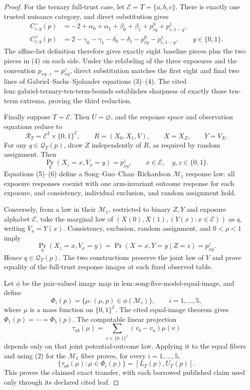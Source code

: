 \documentclass{article}
\begin{document}
\begin{proof}
For the ternary full-trust case, let
\(\mathcal E=T=\{a,b,c\}\).  There is exactly one trusted nuisance category,
and direct substitution gives
\[
\begin{aligned}
 C^-_{c,y}(p)
 &=-2+\alpha_0+\alpha_1+\beta_0+\beta_1
      +p^0_{cy}+p^1_{c,1-y},\\
 C^+_{c,y}(p)
 &=2-\gamma_0-\gamma_1-\delta_0-\delta_1
      -p^0_{cy}-p^1_{c,1-y},
 \qquad y\in\{0,1\}.
\end{aligned} \tag{4}
\]
The affine-list definition therefore gives exactly eight baseline pieces
plus the two pieces in (4) on each side.  Under the relabeling of the three
exposures and the convention \(p_{xy\cdot z}=p^z_{xy}\), direct substitution
matches the first eight and final two lines of Gabriel--Sachs--Sjolander
equations (3)--(4).  The cited
\(\mathrm{lem{:}gabriel\mbox{-}ternary\mbox{-}ten\mbox{-}term\mbox{-}bounds}\)
establishes sharpness of exactly those ten-term extrema, proving the third
reduction.

Finally suppose \(T=\mathcal E\).  Then \(U=\varnothing\), and the response
space and observation equations reduce to
\[
 \mathcal R_T=\mathcal E^2\times\{0,1\}^{\mathcal E},
 \qquad R=(X_0,X_1,V),
 \qquad X=X_Z,
 \qquad Y=V_X. \tag{5}
\]
For any \(q\in\mathcal Q_T(p)\), draw \(Z\) independently of \(R\), as
required by random assignment.  Then
\[
 \Pr_q(X_z=x,V_x=y)=p^z_{xy},
 \qquad x\in\mathcal E,\quad y,z\in\{0,1\}. \tag{6}
\]
Equations (5)--(6) define a Song--Guo--Chan--Richardson
\(\mathcal M_1\) response law: all exposure responses coexist with one
arm-invariant outcome response for each exposure, and consistency,
individual exclusion, and random assignment hold.

Conversely, from a law in their \(\mathcal M_1\), restricted to binary
\(Z,Y\) and exposure alphabet \(\mathcal E\), take the marginal law of
\((X(0),X(1),(Y(x):x\in\mathcal E))\) as \(q\), writing \(V_x=Y(x)\).
Consistency, exclusion, random assignment, and \(0<\rho<1\) imply
\[
 \Pr_q(X_z=x,V_x=y)=\Pr(X=x,Y=y\mid Z=z)=p^z_{xy}.
\]
Hence \(q\in\mathcal Q_T(p)\).  The two constructions preserve the joint
law of \(V\) and prove equality of the full-trust response images at each
fixed observed table.

Let \(\phi\) be the pair-valued image map in
\(\mathrm{lem{:}song\mbox{-}five\mbox{-}model\mbox{-}equal\mbox{-}image}\),
and define
\[
 \Phi_i(p)=\{\mu:(\mu,p)\in\phi(\mathcal M_i)\},
 \qquad i=1,\ldots,5,
\]
where \(\mu\) is a mass function on \(\{0,1\}^{\mathcal E}\).  The cited
equal-image theorem gives
\(\Phi_1(p)=\cdots=\Phi_5(p)\).  The computable linear projection
\[
 \tau_{ab}(\mu)=\sum_{v\in\{0,1\}^{\mathcal E}}(v_b-v_a)\mu(v)
\]
depends only on that joint potential-outcome law.  Applying it to the equal
fibers and using (2) for the \(\mathcal M_1\) fiber proves, for every
\(i=1,\ldots,5\),
\[
 \{\tau_{ab}(\mu):\mu\in\Phi_i(p)\}=[L_T(p),U_T(p)].
\]
This proves the claimed exact transfer, with each borrowed published claim
used only through its declared cited leaf.
\end{proof}
\end{document}
